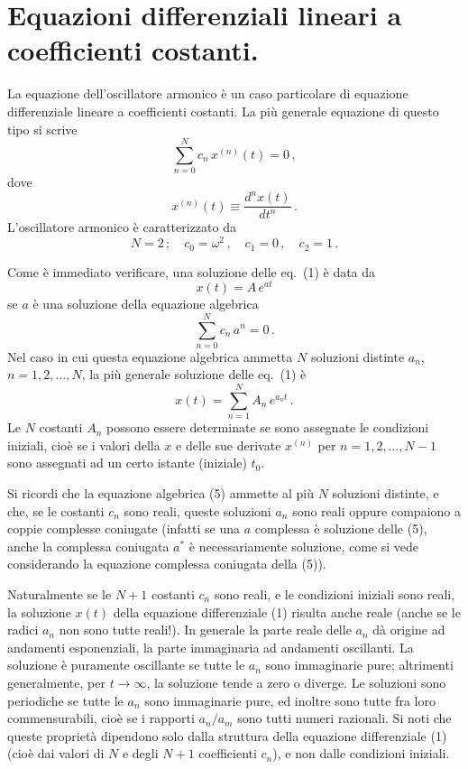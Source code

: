 \documentclass[11pt, a4paper]{book}
\numberwithin{equation}{section}
\begin{document}
\section{Equazioni differenziali lineari a coefficienti costanti.}

La equazione dell'oscillatore armonico è un caso particolare di equazione differenziale lineare a coefficienti costanti. La più generale equazione di questo tipo si scrive
\begin{equation}
    \sum_{n=0}^{N} c_n \, x^{(n)}(t) = 0 \,,
\end{equation}
dove
\begin{equation}
    x^{(n)}(t) \equiv \frac{d^n x(t)}{d t^n} \,.
\end{equation}
L'oscillatore armonico è caratterizzato da
\begin{equation}
    N = 2 \,; \quad c_0 = \omega^2 \,, \quad c_1 = 0 \,, \quad c_2 = 1 \,.
\end{equation}

Come è immediato verificare, una soluzione delle eq.~(1) è data da
\begin{equation}
    x(t) = A \, e^{at}
\end{equation}
se $a$ è una soluzione della equazione algebrica
\begin{equation}
    \sum_{n=0}^{N} c_n \, a^n = 0 \,.
\end{equation}
Nel caso in cui questa equazione algebrica ammetta $N$ soluzioni distinte $a_n$, $n = 1, 2, \ldots, N$, la più generale soluzione delle eq.~(1) è
\begin{equation}
    x(t) = \sum_{n=1}^{N} A_n \, e^{a_n t} \,.
\end{equation}
Le $N$ costanti $A_n$ possono essere determinate se sono assegnate le condizioni iniziali, cioè se i valori della $x$ e delle sue derivate $x^{(n)}$ per $n = 1, 2, \ldots, N-1$ sono assegnati ad un certo istante (iniziale) $t_0$.

Si ricordi che la equazione algebrica (5) ammette al più $N$ soluzioni distinte, e che, se le costanti $c_n$ sono reali, queste soluzioni $a_n$ sono reali oppure compaiono a coppie complesse coniugate (infatti se una $a$ complessa è soluzione delle (5), anche la complessa coniugata $a^*$ è necessariamente soluzione, come si vede considerando la equazione complessa coniugata della (5)).

Naturalmente se le $N+1$ costanti $c_n$ sono reali, e le condizioni iniziali sono reali, la soluzione $x(t)$ della equazione differenziale (1) risulta anche reale (anche se le radici $a_n$ non sono tutte reali!). In generale la parte reale delle $a_n$ dà origine ad andamenti esponenziali, la parte immaginaria ad andamenti oscillanti. La soluzione è puramente oscillante se tutte le $a_n$ sono immaginarie pure; altrimenti generalmente, per $t \to \infty$, la soluzione tende a zero o diverge. Le soluzioni sono periodiche se tutte le $a_n$ sono immaginarie pure, ed inoltre sono tutte fra loro commensurabili, cioè se i rapporti $a_n / a_m$ sono tutti numeri razionali. Si noti che queste proprietà dipendono solo dalla struttura della equazione differenziale (1) (cioè dai valori di $N$ e degli $N+1$ coefficienti $c_n$), e non dalle condizioni iniziali.
\end{document}
